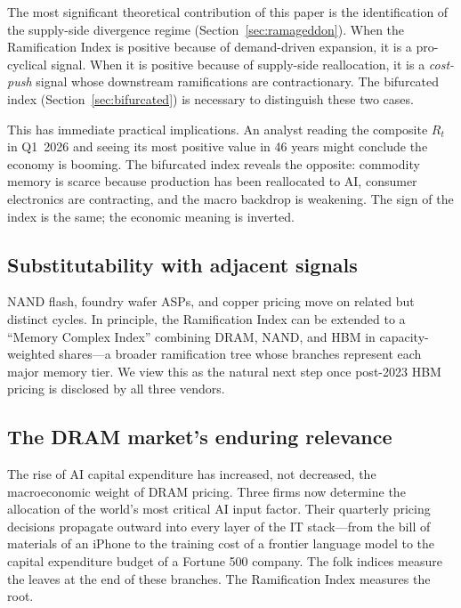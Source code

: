 \documentclass[12pt]{article}
\theoremstyle{definition}
\begin{document}
The most significant theoretical contribution of this paper is the identification of the supply-side divergence regime (Section~\ref{sec:ramageddon}). When the Ramification Index is positive because of demand-driven expansion, it is a pro-cyclical signal. When it is positive because of supply-side reallocation, it is a \emph{cost-push} signal whose downstream ramifications are contractionary. The bifurcated index (Section~\ref{sec:bifurcated}) is necessary to distinguish these two cases.

This has immediate practical implications. An analyst reading the composite $R_t$ in Q1~2026 and seeing its most positive value in 46 years might conclude the economy is booming. The bifurcated index reveals the opposite: commodity memory is scarce because production has been reallocated to AI, consumer electronics are contracting, and the macro backdrop is weakening. The sign of the index is the same; the economic meaning is inverted.

\subsection{Substitutability with adjacent signals}

NAND flash, foundry wafer ASPs, and copper pricing move on related but distinct cycles. In principle, the Ramification Index can be extended to a ``Memory Complex Index'' combining DRAM, NAND, and HBM in capacity-weighted shares---a broader ramification tree whose branches represent each major memory tier. We view this as the natural next step once post-2023 HBM pricing is disclosed by all three vendors.

\subsection{The DRAM market's enduring relevance}

The rise of AI capital expenditure has increased, not decreased, the macroeconomic weight of DRAM pricing. Three firms now determine the allocation of the world's most critical AI input factor. Their quarterly pricing decisions propagate outward into every layer of the IT stack---from the bill of materials of an iPhone to the training cost of a frontier language model to the capital expenditure budget of a Fortune 500 company. The folk indices measure the leaves at the end of these branches. The Ramification Index measures the root.


\end{document}
